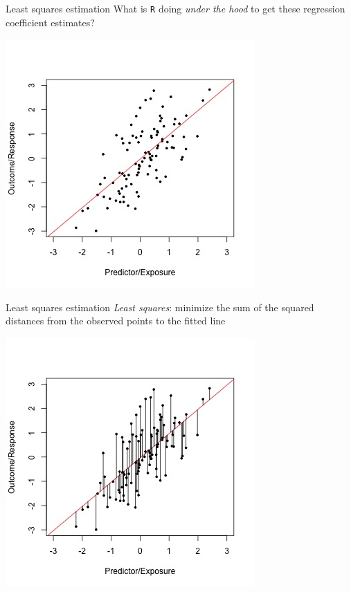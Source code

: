 \documentclass[10pt,t]{beamer}
\begin{document}
\begin{frame}{Least squares estimation}
What is \texttt{R} doing \textit{under the hood} to get these regression coefficient estimates? \pause

\vspace{0.3cm}

\centering \includegraphics[scale=0.45]{linear-regr.jpg}
\end{frame}

\begin{frame}{Least squares estimation}
\textit{Least squares}: minimize the sum of the squared distances from the observed points to the fitted line

\vspace{0.3cm}

\centering \includegraphics[scale=0.45]{linear-regr-ls.jpg}

\end{frame}
\end{document}
